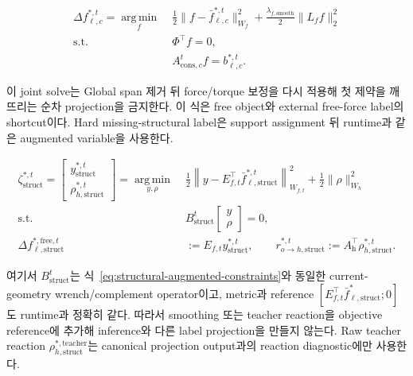 \documentclass[11pt,a4paper]{article}
\newcommand{\argmin}{\operatorname*{arg\,min}}
\begin{document}
\begin{equation}
\begin{aligned}
  \Delta f_{\ell,c}^{*,t}
  =\argmin_f\;&
  \frac12\|f-\bar f_{\ell,c}^{*,t}\|_{W_f}^2
  +\frac{\lambda_{f,\mathrm{smooth}}}{2}\|L_ff\|_2^2\\
  \mathrm{s.t.}\;&
  \Phi^\top f=0,\\
  &A_{\mathrm{cons},c}^tf=b_{\ell,c}^{*,t}.
  \label{eq:teacher-local-force-label}
\end{aligned}
\end{equation}

이 joint solve는 Global span 제거 뒤 force/torque 보정을 다시 적용해
첫 제약을 깨뜨리는 순차 projection을 금지한다.
이 식은 free object와 external free-force label의 shortcut이다.
Hard missing-structural label은 support assignment 뒤 runtime과 같은 augmented variable을 사용한다.

\begin{equation}
\begin{aligned}
  \zeta_{\mathrm{struct}}^{*,t}
  =
  \begin{bmatrix}y_{\mathrm{struct}}^{*,t}\\\rho_{h,\mathrm{struct}}^{*,t}\end{bmatrix}
  =\argmin_{y,\rho}\;&
  \frac12\left\|
  y-E_{f,t}^\top\bar f_{\ell,\mathrm{struct}}^{*,t}
  \right\|_{W_{f,t}}^2
  +\frac12\|\rho\|_{W_h}^2\\
  \mathrm{s.t.}\;&
  B_{\mathrm{struct}}^t
  \begin{bmatrix}y\\\rho\end{bmatrix}=0,\\
  \Delta f_{\ell,\mathrm{struct}}^{*,\mathrm{free},t}
  &:={}E_{f,t}y_{\mathrm{struct}}^{*,t},\qquad
  r_{o\rightarrow h,\mathrm{struct}}^{*,t}
  :=A_{\mathrm h}^\top\rho_{h,\mathrm{struct}}^{*,t}.
  \label{eq:teacher-hard-structural-augmented-label}
\end{aligned}
\end{equation}

여기서 \(B_{\mathrm{struct}}^t\)는 식~\eqref{eq:structural-augmented-constraints}와
동일한 current-geometry wrench/complement operator이고, metric과 reference
\([E_{f,t}^\top\bar f_{\ell,\mathrm{struct}}^*;0]\)도 runtime과 정확히 같다.
따라서 smoothing 또는 teacher reaction을 objective reference에 추가해 inference와 다른
label projection을 만들지 않는다. Raw teacher reaction
\(\rho_{h,\mathrm{struct}}^{*,\mathrm{teacher}}\)는 canonical projection output과의
reaction diagnostic에만 사용한다.
\end{document}
